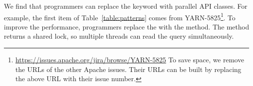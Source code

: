 
We find that programmers can replace the  keyword with parallel API classes. For example, the first item of Table~\ref{table:patterns} comes from YARN-5825\footnote{\url{https://issues.apache.org/jira/browse/YARN-5825} To save space, we remove the URLs of the other Apache issues. Their URLs can be built by replacing the above URL with their issue number.}. To improve the performance, programmers replace the  with the  method. The method returns a shared lock, so multiple threads can read the query simultaneously.



